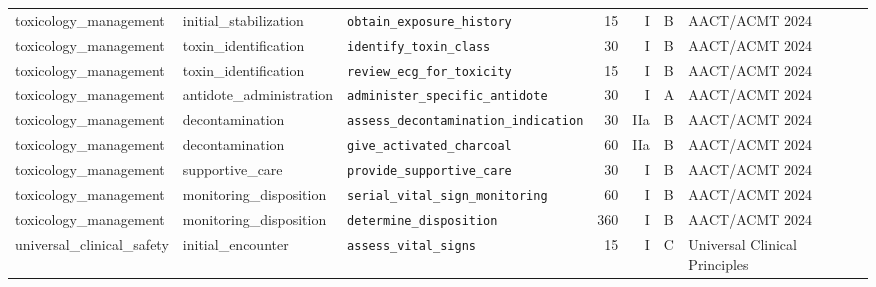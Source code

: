 \begin{longtable}{lllrrll}
toxicology\_management & initial\_stabilization & \texttt{obtain\_exposure\_history} & 15 & I & B & AACT/ACMT 2024 \\
toxicology\_management & toxin\_identification & \texttt{identify\_toxin\_class} & 30 & I & B & AACT/ACMT 2024 \\
toxicology\_management & toxin\_identification & \texttt{review\_ecg\_for\_toxicity} & 15 & I & B & AACT/ACMT 2024 \\
toxicology\_management & antidote\_administration & \texttt{administer\_specific\_antidote} & 30 & I & A & AACT/ACMT 2024 \\
toxicology\_management & decontamination & \texttt{assess\_decontamination\_indication} & 30 & IIa & B & AACT/ACMT 2024 \\
toxicology\_management & decontamination & \texttt{give\_activated\_charcoal} & 60 & IIa & B & AACT/ACMT 2024 \\
toxicology\_management & supportive\_care & \texttt{provide\_supportive\_care} & 30 & I & B & AACT/ACMT 2024 \\
toxicology\_management & monitoring\_disposition & \texttt{serial\_vital\_sign\_monitoring} & 60 & I & B & AACT/ACMT 2024 \\
toxicology\_management & monitoring\_disposition & \texttt{determine\_disposition} & 360 & I & B & AACT/ACMT 2024 \\
universal\_clinical\_safety & initial\_encounter & \texttt{assess\_vital\_signs} & 15 & I & C & Universal Clinical Principles \\
\end{longtable}
